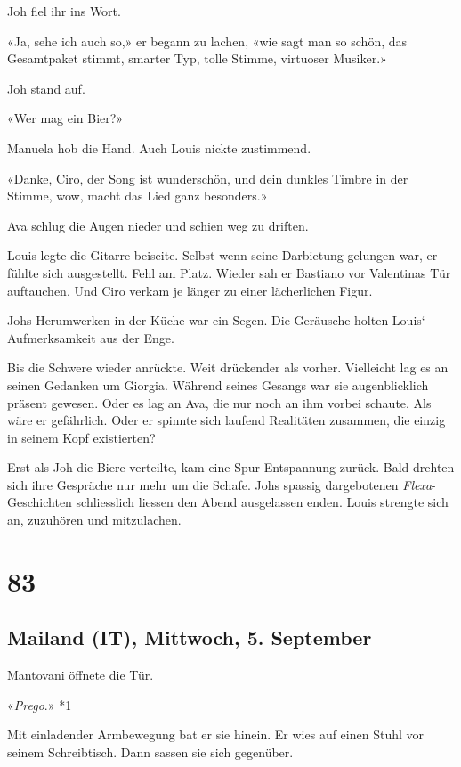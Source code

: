 Joh fiel ihr ins Wort.

«Ja, sehe ich auch so,» er begann zu lachen, «wie sagt man so schön, das
Gesamtpaket stimmt, smarter Typ, tolle Stimme, virtuoser Musiker.»

Joh stand auf.

«Wer mag ein Bier?»

Manuela hob die Hand. Auch Louis nickte zustimmend.

«Danke, Ciro, der Song ist wunderschön, und dein dunkles Timbre in der
Stimme, wow, macht das Lied ganz besonders.»

Ava schlug die Augen nieder und schien weg zu driften.

Louis legte die Gitarre beiseite. Selbst wenn seine Darbietung gelungen
war, er fühlte sich ausgestellt. Fehl am Platz. Wieder sah er Bastiano
vor Valentinas Tür auftauchen. Und Ciro verkam je länger zu einer
lächerlichen Figur.

Johs Herumwerken in der Küche war ein Segen. Die Geräusche holten Louis`
Aufmerksamkeit aus der Enge.

Bis die Schwere wieder anrückte. Weit drückender als vorher. Vielleicht
lag es an seinen Gedanken um Giorgia. Während seines Gesangs war sie
augenblicklich präsent gewesen. Oder es lag an Ava, die nur noch an ihm
vorbei schaute. Als wäre er gefährlich. Oder er spinnte sich laufend
Realitäten zusammen, die einzig in seinem Kopf existierten?

Erst als Joh die Biere verteilte, kam eine Spur Entspannung zurück. Bald
drehten sich ihre Gespräche nur mehr um die Schafe. Johs spassig
dargebotenen \emph{Flexa}-Geschichten schliesslich liessen den Abend
ausgelassen enden. Louis strengte sich an, zuzuhören und mitzulachen.

\chapter{83}\label{section-83}

\section{Mailand (IT), Mittwoch, 5.
September}\label{mailand-it-mittwoch-5.-september}

Mantovani öffnete die Tür.

«\emph{Prego}.» *1

Mit einladender Armbewegung bat er sie hinein. Er wies auf einen Stuhl
vor seinem Schreibtisch. Dann sassen sie sich gegenüber.

